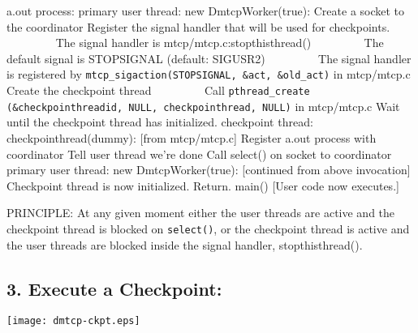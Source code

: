 \documentclass{article}
\begin{document}
\begin{algorithmic}[1]
\STATE a.out process:
\STATE {\ \ } primary user thread:
\STATE {\ \ \ \ } new DmtcpWorker(true):
\STATE {\ \ \ \ \ \ } Create a socket to the coordinator
\STATE {\ \ \ \ \ \ } Register the signal handler that will be
	used for checkpoints. \newline
\hbox{\ \ \ \ \ \ \ \ } The signal handler is
		 mtcp/mtcp.c:stopthisthread()\newline
\hbox{\ \ \ \ \ \ \ \ } The default signal is STOPSIGNAL
		 (default: SIGUSR2)\newline
\hbox{\ \ \ \ \ \ \ \ } The signal handler is registered by
	 {\tt mtcp\_sigaction(STOPSIGNAL, \&act, \&old\_act)} in mtcp/mtcp.c
\STATE {\ \ \ \ \ \ } Create the checkpoint thread
\hbox{\ \ \ \ \ \ \ \ } Call
	{\tt pthread\_create (\&checkpointhreadid, NULL, checkpointhread, NULL)}
	in mtcp/mtcp.c
\STATE {\ \ \ \ \ \ } Wait until the checkpoint thread has initialized.
\newline
\STATE {\ \ } checkpoint thread:
\STATE {\ \ \ \ } checkpointhread(dummy):  [from mtcp/mtcp.c]
\STATE {\ \ \ \ \ \ } Register a.out process with coordinator
\STATE {\ \ \ \ \ \ } Tell user thread we're done
\STATE {\ \ \ \ \ \ } Call select() on socket to coordinator
\newline
\STATE {\ \ } primary user thread:
\STATE {\ \ \ \ } new DmtcpWorker(true):  [continued from above invocation]
\STATE {\ \ \ \ \ \ } Checkpoint thread is now initialized.  Return.
\STATE {\ \ \ \ } main()  [User code now executes.]
\end{algorithmic}

\bigskip
\noindent
PRINCIPLE:  At any given moment either the user threads are active and
	the checkpoint thread is blocked on {\tt select()}, or
	the checkpoint thread is active and the user threads are
	blocked inside the signal handler, stopthisthread().




\newpage

\subsection*{3. Execute a Checkpoint:}

\begin{center}
\texttt{[image: dmtcp-ckpt.eps]}
\end{center}
\end{document}
